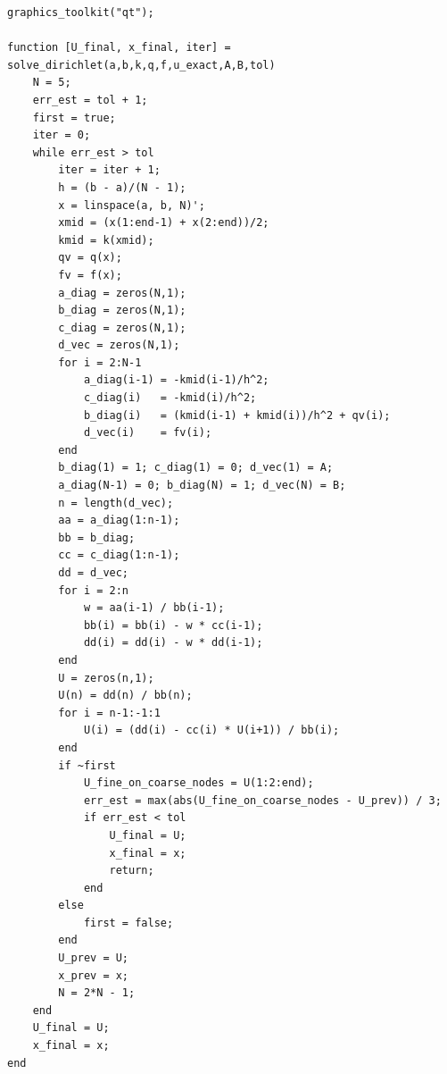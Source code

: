 \documentclass[14pt,a4paper]{extarticle}  %
\numberwithin{equation}{section}
\begin{document}
\begin{verbatim}
graphics_toolkit("qt");

function [U_final, x_final, iter] = solve_dirichlet(a,b,k,q,f,u_exact,A,B,tol)
    N = 5;
    err_est = tol + 1;
    first = true;
    iter = 0;
    while err_est > tol
        iter = iter + 1;
        h = (b - a)/(N - 1);
        x = linspace(a, b, N)';
        xmid = (x(1:end-1) + x(2:end))/2;
        kmid = k(xmid);
        qv = q(x);
        fv = f(x);
        a_diag = zeros(N,1);
        b_diag = zeros(N,1);
        c_diag = zeros(N,1);
        d_vec = zeros(N,1);
        for i = 2:N-1
            a_diag(i-1) = -kmid(i-1)/h^2;
            c_diag(i)   = -kmid(i)/h^2;
            b_diag(i)   = (kmid(i-1) + kmid(i))/h^2 + qv(i);
            d_vec(i)    = fv(i);
        end
        b_diag(1) = 1; c_diag(1) = 0; d_vec(1) = A;
        a_diag(N-1) = 0; b_diag(N) = 1; d_vec(N) = B;
        n = length(d_vec);
        aa = a_diag(1:n-1);
        bb = b_diag;
        cc = c_diag(1:n-1);
        dd = d_vec;
        for i = 2:n
            w = aa(i-1) / bb(i-1);
            bb(i) = bb(i) - w * cc(i-1);
            dd(i) = dd(i) - w * dd(i-1);
        end
        U = zeros(n,1);
        U(n) = dd(n) / bb(n);
        for i = n-1:-1:1
            U(i) = (dd(i) - cc(i) * U(i+1)) / bb(i);
        end
        if ~first
            U_fine_on_coarse_nodes = U(1:2:end);
            err_est = max(abs(U_fine_on_coarse_nodes - U_prev)) / 3;
            if err_est < tol
                U_final = U;
                x_final = x;
                return;
            end
        else
            first = false;
        end
        U_prev = U;
        x_prev = x;
        N = 2*N - 1;
    end
    U_final = U;
    x_final = x;
end


\end{verbatim}
\end{document}
